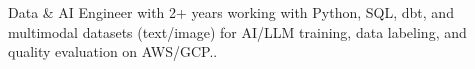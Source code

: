 




\vspace{6pt}

\begin{cvparagraph}
Data \& AI Engineer with 2+ years working with Python, SQL, dbt, and multimodal datasets (text/image) for AI/LLM training, data labeling, and quality evaluation on AWS/GCP..
\end{cvparagraph}

\vspace{2pt}
